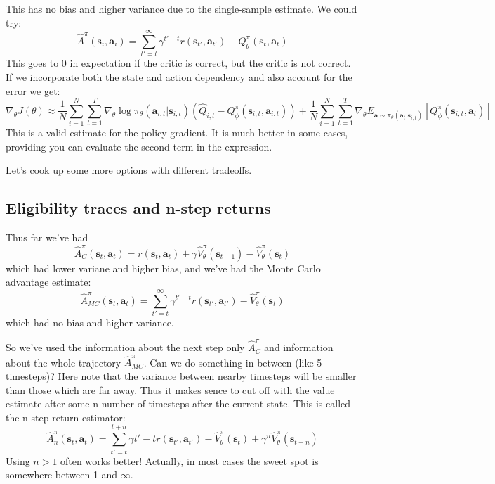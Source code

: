 \documentclass{report}
\begin{document}
This has no bias and higher variance due to the single-sample estimate.
We could  try:
\begin{equation}
		\hat{A}^\pi (\bm{s}_{i}, \bm{a}_{i}) = \sum_{t'=t}^{\infty} \gamma^{t'-t} r(\bm{s}_{t'}, \bm{a}_{t'}) - Q^\pi_\theta(\bm{s}_t, \bm{a}_t)
\end{equation}
This goes to 0 in expectation if the critic is correct, but the critic is not correct.
If we incorporate both the state and action dependency and also account for the error we get:
\begin{equation}
		\nabla_\theta J(\theta) \approx \frac{1}{N} \sum_{i=1}^{N} \sum_{t=1}^{T} \nabla_{\theta} \log \pi_\theta(\bm{a}_{i,t}|\bm{s}_{i,t})
		\left( \hat{Q}_{i,t} - Q^\pi_\phi (\bm{s}_{i,t}, \bm{a}_{i,t})  \right) 
		+ \frac{1}{N} \sum_{i=1}^{N} \sum_{t=1}^{T} \nabla_{\theta}
		E_{\bm{a} \sim \pi_\theta(\bm{a}_t|\bm{s}_{i,t})}
		\left[ Q^\pi_\phi (\bm{s}_{i,t}, \bm{a}_{t}) \right] 
\end{equation}
This is a valid estimate for the policy gradient.
It is much better in some cases, providing you can evaluate the second term in the expression.

Let's cook up some more options with different tradeoffs.

\subsection{Eligibility traces and n-step returns}
Thus far we've had
\begin{equation}
\hat{A}^\pi_C (\bm{s}_{t}, \bm{a}_{t}) =
r(\bm{s}_{t}, \bm{a}_{t}) + \gamma \hat{V}^\pi_\theta(\bm{s}_{t+1}) - \hat{V}^\pi_\theta(\bm{s}_t)
\end{equation}
which had lower variane and higher bias,
and we've had the Monte Carlo advantage estimate:
\begin{equation}
		\hat{A}^\pi_{MC} (\bm{s}_{t}, \bm{a}_{t}) =
		\sum_{t'=t}^{\infty}  \gamma^{t'-t} r(\bm{s}_{t'}, \bm{a}_{t'})  - \hat{V}^\pi_\theta(\bm{s}_t)
\end{equation}
which had no bias and higher variance.

So we've used the information about the next step only $\hat{A}^\pi_C$ and information about 
the whole trajectory $\hat{A}^\pi_{MC}$.
Can we do something in between (like 5 timesteps)?
Here note that the variance between nearby timesteps will be smaller than those which are far away.
Thus it makes sence to cut off with the value estimate after some n number of timesteps after the current state.
This is called the n-step return estimator:
\begin{equation}
		\hat{A}^\pi_n (\bm{s}_{t}, \bm{a}_{t}) =
		\sum_{t'=t}^{t+n} \gamma{t'-t} r(\bm{s}_{t'}, \bm{a}_{t'})
		- \hat{V}^\pi_\theta(\bm{s}_t) + \gamma^n \hat{V}^\pi_\theta(\bm{s}_{t+n})
\end{equation}
Using $n>1$ often works better! Actually, in most cases
the sweet spot is somewhere between 1 and $\infty$.
\end{document}
